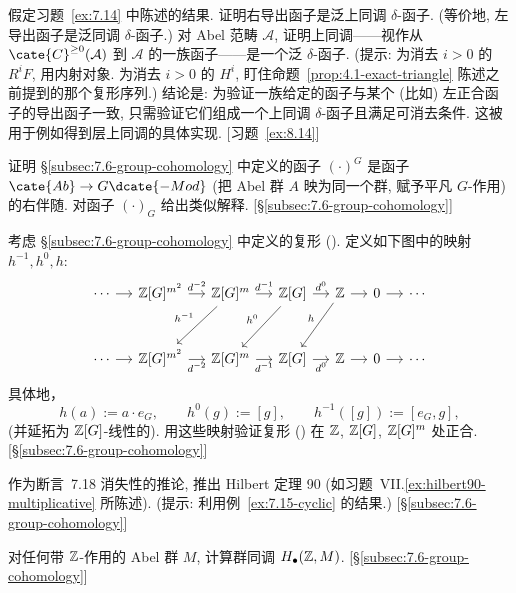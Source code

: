 \begin{prob}\label{ex:7.15}
假定习题~\ref{ex:7.14} 中陈述的结果. 证明右导出函子是泛上同调 $\delta$-函子. (等价地, 左导出函子是泛同调 $\delta$-函子.) 对 Abel 范畴 $\mathcal{A}$, 证明上同调——视作从 $\cate{C}^{\ge0}(\mathcal{A})$ 到 $\mathcal{A}$ 的一族函子——是一个泛 $\delta$-函子. (提示: 为消去 $i>0$ 的 $R^i F$, 用内射对象. 为消去 $i>0$ 的 $H^i$, 盯住命题~\ref{prop:4.1-exact-triangle} 陈述之前提到的那个复形序列.) 结论是: 为验证一族给定的函子与某个 (比如) 左正合函子的导出函子一致, 只需验证它们组成一个上同调 $\delta$-函子且满足可消去条件. 这被用于例如得到层上同调的具体实现. [习题~\ref{ex:8.14}]
\end{prob}

\begin{prob}\label{ex:7.16}
证明 \S\ref{subsec:7.6-group-cohomology} 中定义的函子 $(\cdot)^G$ 是函子 $\cate{Ab}\to G\dcate{-Mod}$ (把 Abel 群 $A$ 映为同一个群, 赋予平凡 $G$-作用) 的右伴随. 对函子 $(\cdot)_G$ 给出类似解释. [\S\ref{subsec:7.6-group-cohomology}]
\end{prob}

\begin{prob}\label{ex:7.17}
考虑 \S\ref{subsec:7.6-group-cohomology} 中定义的复形 (\dag). 定义如下图中的映射 $h^{-1},h^0,h$:
\[
\begin{tikzcd}[column sep=small,row sep=large]
\cdots\ar[r]&\ZZ[G]^{m^2}\ar[r,"d^{-2}"]&\ZZ[G]^m\ar[r,"d^{-1}"]\ar[dl,"h^{-1}"']&\ZZ[G]\ar[r,"d^0"]\ar[dl,"h^0"']&\ZZ\ar[r]\ar[dl,"h"']&0\ar[r]&\cdots\\
\cdots\ar[r]&\ZZ[G]^{m^2}\ar[r,"d^{-2}"']&\ZZ[G]^m\ar[r,"d^{-1}"']&\ZZ[G]\ar[r,"d^0"']&\ZZ\ar[r]&0\ar[r]&\cdots
\end{tikzcd}
\]
具体地，
\[
h(a):=a\cdot e_G,\qquad h^0(g):=[g],\qquad h^{-1}([g]):=[e_G,g],
\]
(并延拓为 $\mathbb{Z}[G]$-线性的). 用这些映射验证复形 (\dag) 在 $\mathbb{Z}$, $\mathbb{Z}[G]$, $\mathbb{Z}[G]^m$ 处正合. [\S\ref{subsec:7.6-group-cohomology}]
\end{prob}

\begin{prob}\label{ex:7.18}
作为断言~7.18 消失性的推论, 推出 Hilbert 定理 90 (如习题~VII.\ref{ex:hilbert90-multiplicative} 所陈述). (提示: 利用例~\ref{ex:7.15-cyclic} 的结果.) [\S\ref{subsec:7.6-group-cohomology}]
\end{prob}

\begin{prob}\label{ex:7.19}
对任何带 $\mathbb{Z}$-作用的 Abel 群 $M$, 计算群同调 $H_\bullet(\mathbb{Z},M)$. [\S\ref{subsec:7.6-group-cohomology}]
\end{prob}

